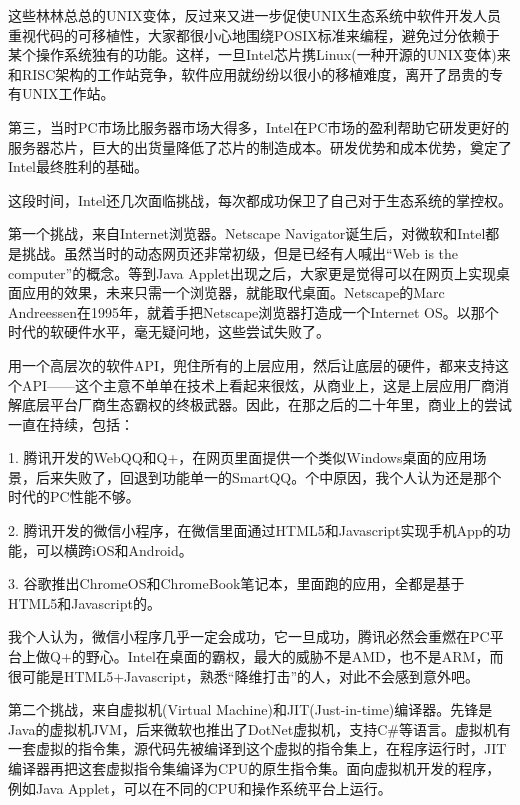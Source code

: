 \documentclass[utf8]{book}
\begin{document}
	这些林林总总的UNIX变体，反过来又进一步促使UNIX生态系统中软件开发人员重视代码的可移植性，大家都很小心地围绕POSIX标准来编程，避免过分依赖于某个操作系统独有的功能。这样，一旦Intel芯片携Linux(一种开源的UNIX变体)来和RISC架构的工作站竞争，软件应用就纷纷以很小的移植难度，离开了昂贵的专有UNIX工作站。
	
	第三，当时PC市场比服务器市场大得多，Intel在PC市场的盈利帮助它研发更好的服务器芯片，巨大的出货量降低了芯片的制造成本。研发优势和成本优势，奠定了Intel最终胜利的基础。
	
	这段时间，Intel还几次面临挑战，每次都成功保卫了自己对于生态系统的掌控权。
	
	第一个挑战，来自Internet浏览器。Netscape Navigator诞生后，对微软和Intel都是挑战。虽然当时的动态网页还非常初级，但是已经有人喊出“Web is the computer”的概念。等到Java Applet出现之后，大家更是觉得可以在网页上实现桌面应用的效果，未来只需一个浏览器，就能取代桌面。Netscape的Marc Andreessen在1995年，就着手把Netscape浏览器打造成一个Internet OS。以那个时代的软硬件水平，毫无疑问地，这些尝试失败了。
	
	用一个高层次的软件API，兜住所有的上层应用，然后让底层的硬件，都来支持这个API——这个主意不单单在技术上看起来很炫，从商业上，这是上层应用厂商消解底层平台厂商生态霸权的终极武器。因此，在那之后的二十年里，商业上的尝试一直在持续，包括：
	
	1. 腾讯开发的WebQQ和Q+，在网页里面提供一个类似Windows桌面的应用场景，后来失败了，回退到功能单一的SmartQQ。个中原因，我个人认为还是那个时代的PC性能不够。
	
	2. 腾讯开发的微信小程序，在微信里面通过HTML5和Javascript实现手机App的功能，可以横跨iOS和Android。
	
	3. 谷歌推出ChromeOS和ChromeBook笔记本，里面跑的应用，全都是基于HTML5和Javascript的。
	
	我个人认为，微信小程序几乎一定会成功，它一旦成功，腾讯必然会重燃在PC平台上做Q+的野心。Intel在桌面的霸权，最大的威胁不是AMD，也不是ARM，而很可能是HTML5+Javascript，熟悉“降维打击”的人，对此不会感到意外吧。
	
	第二个挑战，来自虚拟机(Virtual Machine)和JIT(Just-in-time)编译器。先锋是Java的虚拟机JVM，后来微软也推出了DotNet虚拟机，支持C\#等语言。虚拟机有一套虚拟的指令集，源代码先被编译到这个虚拟的指令集上，在程序运行时，JIT编译器再把这套虚拟指令集编译为CPU的原生指令集。面向虚拟机开发的程序，例如Java Applet，可以在不同的CPU和操作系统平台上运行。
	
\end{document}
